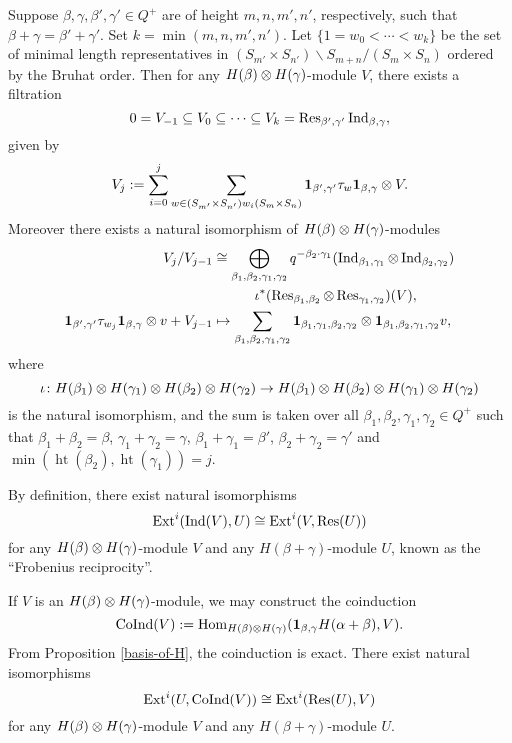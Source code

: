 \begin{proposition}\label{mackey}
    Suppose $\beta,\gamma,\beta',\gamma'\in Q^+$ are of height $m,n,m',n'$,
    respectively, such that $\beta+\gamma = \beta'+\gamma'$. Set
    $k = \min(m,n,m',n')$. Let $\{1 = w_0<\cdots<w_k\}$ be the set of minimal
    length representatives in 
    $(S_{m'}\times S_{n'})\backslash S_{m+n}/(S_m\times S_n)$ ordered by
    the Bruhat order. Then for any $H(\beta)\otimes H(\gamma)$-module $V$,
    there exists a filtration $$0 = V_{-1}\subseteq V_0\subseteq \cdots
    \subseteq V_k = \operatorname{Res}_{\beta',\gamma'}\operatorname{Ind}_{\beta,\gamma},$$ given by
    $$V_j := \sum_{i = 0}^j\sum_{w\in(S_{m'}\times S_{n'})w_i(S_m\times S_n)}
    \mathbf{1}_{\beta',\gamma'}\tau_w\mathbf{1}_{\beta,\gamma}\otimes V.$$ Moreover there exists
    a natural isomorphism of $H(\beta)\otimes H(\gamma)$-modules
    \[
        \begin{aligned}
            V_j/V_{j-1}&\cong\bigoplus_{\beta_1,\beta_2,\gamma_1,\gamma_2}
            q^{-\beta_2\cdot\gamma_1}(\operatorname{Ind}_{\beta_1,\gamma_1}\otimes\operatorname{Ind}_{\beta_2,\gamma_2})
            \\&\hspace{3em}\iota^*(\operatorname{Res}_{\beta_1,\beta_2}\otimes\operatorname{Res}_{\gamma_1,\gamma_2})(V),\\
            \mathbf{1}_{\beta',\gamma'}\tau_{w_j}\mathbf{1}_{\beta,\gamma}\otimes v+V_{j-1}&
        \mapsto\sum_{\beta_1,\beta_2,\gamma_1,\gamma_2}
        \mathbf{1}_{\beta_1,\gamma_1,\beta_2,\gamma_2}\otimes
        \mathbf{1}_{\beta_1,\beta_2,\gamma_1,\gamma_2}v,
        \end{aligned}
    \]
    where $$\iota\colon H(\beta_1)\otimes H(\gamma_1)\otimes H(\beta_2)\otimes H(\gamma_2)
    \to H(\beta_1)\otimes H(\beta_2)\otimes H(\gamma_1)\otimes H(\gamma_2)$$ is the
    natural isomorphism, and the sum is taken over all 
    $\beta_1,\beta_2,\gamma_1,\gamma_2\in Q^+$ such that $\beta_1+\beta_2 = \beta$,
    $\gamma_1+\gamma_2 = \gamma$, $\beta_1+\gamma_1 = \beta'$,
    $\beta_2+\gamma_2 = \gamma'$ and $\min(\operatorname{ht}(\beta_2),
    \operatorname{ht}(\gamma_1)) = j$.
\end{proposition}

By definition, there exist natural isomorphisms $$\operatorname{Ext}^i(\operatorname{Ind}(V),U)\cong
\operatorname{Ext}^i(V,\operatorname{Res}(U))$$ for any $H(\beta)\otimes H(\gamma)$-module $V$ and 
any $H(\beta+\gamma)$-module $U$, known as the ``Frobenius reciprocity''.

If $V$ is an 
$H(\beta)\otimes H(\gamma)$-module, we may construct the coinduction
\[
    \operatorname{CoInd}(V) := \operatorname{Hom}_{H(\beta)\otimes H(\gamma)}
    (\mathbf{1}_{\beta,\gamma}H(\alpha+\beta),V).
\] 
From Proposition \ref{basis-of-H},
the coinduction is exact. There exist natural isomorphisms
\[
    \operatorname{Ext}^i(U,\operatorname{CoInd}(V))\cong
    \operatorname{Ext}^i(\operatorname{Res}(U),V)
\] 
for any $H(\beta)\otimes H(\gamma)$-module $V$ and 
any $H(\beta+\gamma)$-module $U$. 

